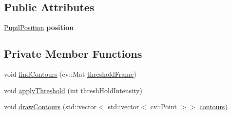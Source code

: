 \subsection*{Public Attributes}
\begin{DoxyCompactItemize}
\item 
\mbox{\label{class_pupil_detect_a3aa92fd80cf4ae3084ec8a04ba7398a3}} 
\mbox{\hyperlink{struct_pupil_position}{Pupil\+Position}} {\bfseries position}
\end{DoxyCompactItemize}
\subsection*{Private Member Functions}
\begin{DoxyCompactItemize}
\item 
void \mbox{\hyperlink{class_pupil_detect_ab852b491f3da3294e89d25777653e20f}{find\+Contours}} (cv\+::\+Mat \mbox{\hyperlink{class_pupil_detect_ad2b693a118fb991ea45cb8fb83dd0f63}{threshold\+Frame}})
\item 
void \mbox{\hyperlink{class_pupil_detect_a0ee35bec8dee73602288be1e95ab7b22}{apply\+Threshold}} (int thresh\+Hold\+Intensity)
\item 
void \mbox{\hyperlink{class_pupil_detect_aa1e4390aead747da32a2f1aaf077da68}{draw\+Contours}} (std\+::vector$<$ std\+::vector$<$ cv\+::\+Point $>$$>$ \mbox{\hyperlink{class_pupil_detect_a28325d88d52b09e78d25f17b3d898aeb}{contours}})
\end{DoxyCompactItemize}
